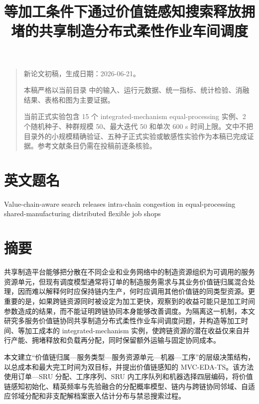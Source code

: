\documentclass[UTF8,11pt]{ctexart}
\title{等加工条件下通过价值链感知搜索释放拥堵的共享制造分布式柔性作业车间调度}
\author{}
\date{}
\newenvironment{draftnote}{\begin{quote}\small\color{gray}}{\end{quote}}
\begin{document}
\maketitle
\thispagestyle{fancy}

\begin{draftnote}
新论文初稿，生成日期：2026-06-21。
\par
本稿严格以当前目录 \texttt{} 中的输入、运行元数据、统一指标、统计检验、消融结果、表格和图为主要证据。
\par
当前正式实验包含 15 个 integrated-mechanism equal-processing 实例、2 个随机种子、种群规模 50、最大迭代 50 和单次 600 s 时间上限。文中不把目录外的小规模精确验证、五种子正式实验或敏感性实验作为本稿已完成证据。参考文献条目仍需在投稿前逐条核验。
\par
\end{draftnote}

\section*{英文题名}

Value-chain-aware search releases intra-chain congestion in equal-processing shared-manufacturing distributed flexible job shops

\section*{摘要}

共享制造平台能够把分散在不同企业和业务网络中的制造资源组织为可调用的服务资源单元，但现有调度模型通常将订单的制造服务需求与其业务价值链归属混合处理，因而难以解释何时应保持链内生产，何时应调用其他价值链的同类型资源。更重要的是，如果跨链资源同时被设定为加工更快，观察到的收益可能只是加工时间参数造成的结果，而不能证明跨链协同本身能够改善调度。为隔离这一机制，本文研究多服务价值链协同共享制造分布式柔性作业车间调度问题，并构造等加工时间、等加工成本的 integrated-mechanism 实例，使跨链资源的潜在收益仅来自并行产能、拥堵释放和负载再分配，同时保留额外运输与固定协同成本。

本文建立“价值链归属—服务类型—服务资源单元—机器—工序”的层级决策结构，以总成本和最大完工时间为双目标，并提出价值链感知的 MVC-EDA-TS。该方法使用订单—SRU 分配、工序序列、SRU 内工序队列和机器选择四层编码，将价值链感知初始化、精英频率与先验融合的分配概率模型、链内与跨链协同邻域、自适应邻域分配和非支配解档案嵌入估计分布与禁忌搜索过程。
\end{document}
